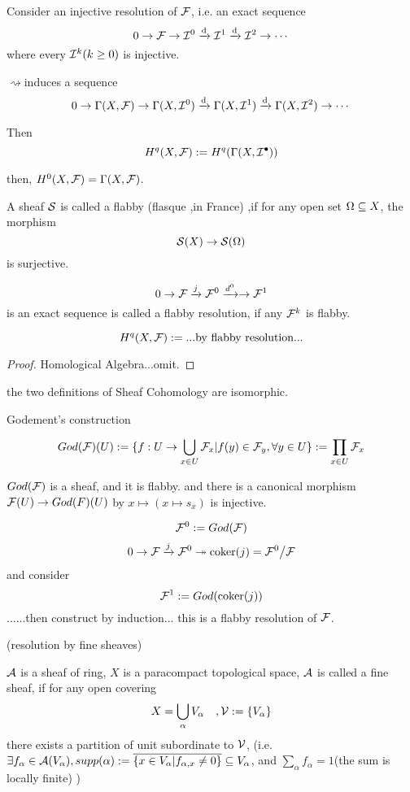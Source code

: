 \begin{definition}
Consider an injective resolution of $\mathcal{F}$, i.e. an exact sequence
$$0\to\mathcal{F}\to\mathcal{I}^0\xrightarrow{\mathrm{d}}\mathcal{I}^1\xrightarrow{\mathrm{d}}\mathcal{I}^2\to\cdots$$
where every $\mathcal{I}^k(k\geq 0)$ is injective.


$\rightsquigarrow $induces a sequence
$$0\to\Gamma(X,\mathcal{F})
\to\Gamma(X,\mathcal{I}^0)\xrightarrow{\mathrm{d}}
\Gamma(X,\mathcal{I}^1)\xrightarrow{\mathrm{d}}
\Gamma(X,\mathcal{I}^2)\to\cdots$$

Then
$$H^q(X,\mathcal{F}):=H^q(\Gamma(X,\mathcal{I}^{\bullet}))$$

\end{definition}

then, $H^0(X,\mathcal{F})=\Gamma(X,\mathcal{F})$.

\begin{definition}
A sheaf $\mathcal{S}$ is called a flabby (flasque ,in France) ,if
for any open set $\Omega\subseteq X$, the morphism
$$\mathcal{S}(X)\to\mathcal{S}(\Omega)$$
is surjective.
\end{definition}

\begin{definition}
$$0\to\mathcal{F}\xrightarrow{j}\mathcal{F}^0\xrightarrow{d^0}\to\mathcal{F}^1$$
is an exact sequence is called a flabby resolution, if
any $\mathcal{F}^k$ is flabby.
\end{definition}

\begin{definition}
$$H^q(X,\mathcal{F}):=...\text{by flabby resolution...}$$
\end{definition}

\begin{proof}
Homological Algebra...omit.
\end{proof}

the two definitions of Sheaf Cohomology are isomorphic.


Godement's construction

$$God(\mathcal{F})(U):=
\{f:U\to\bigcup_{x\in U}\mathcal{F}_x|
f(y)\in\mathcal{F}_y,\forall y\in U\}
:=\prod_{x\in U}\mathcal{F}_x$$

$God(\mathcal{F})$ is a sheaf, and it is flabby. and there is a canonical
morphism $\mathcal{F}(U)\to God(F)(U)$ by $x\mapsto(x\mapsto s_x)$ is injective.

$$\mathcal{F}^0:=God(\mathcal{F})$$
$$0\to\mathcal{F}\xrightarrow{j}\mathcal{F}^0\twoheadrightarrow\operatorname{coker}(j)=\mathcal{F}^0\big/\mathcal{F}$$
and consider
$$\mathcal{F}^1:=God(\operatorname{coker}(j))$$
......then construct by induction... this is a flabby resolution of $\mathcal{F}$.

\begin{definition}(resolution by fine sheaves)

$\mathcal{A}$ is a sheaf of ring,
$X$ is a paracompact topological space, $\mathcal{A}$
is called a fine sheaf, if for any open covering
$$X=\bigcup_{\alpha}V_{\alpha}\quad,\mathcal{V}:=\{V_{\alpha}\}$$
there exists a partition of unit subordinate to $\mathcal{V}$,
(i.e. $\exists f_{\alpha}\in\mathcal{A}(V_{\alpha}),supp(\alpha)
:=\overline{\{x\in V_{\alpha}|f_{\alpha,x}\neq 0\}}\subseteq V_{\alpha}$, and
$\sum_{\alpha}f_{\alpha}=1$(the sum is locally finite)
 )
\end{definition}

